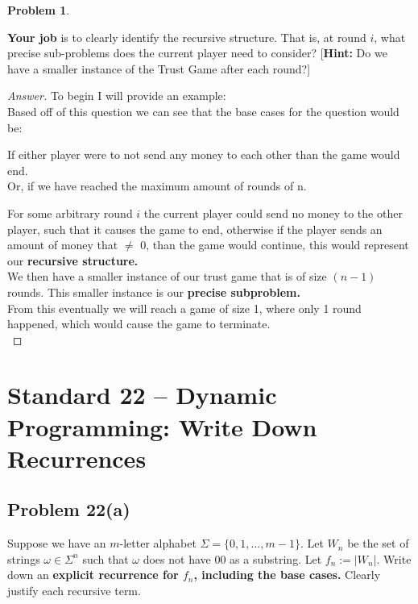 \documentclass[11pt]{article}
\theoremstyle{definition}
\theoremstyle{definition}
\newtheorem{required}{Problem}
\theoremstyle{definition}
\begin{document}
\begin{required}
\begin{enumerate}
\noindent \textbf{Your job} is to clearly identify the recursive structure. That is, at round $i$, what precise sub-problems does the current player need to consider? [\textbf{Hint:} Do we have a smaller instance of the Trust Game after each round?]

\begin{proof}[Answer]
To begin I will provide an example: \\

Based off of this question we can see that the base cases for the question would be: \\
\begin{center}
If either player were to not send any money to each other than the game would end. \\
Or, if we have reached the maximum amount of rounds of n.\\
\end{center}
For some arbitrary round $i$ the current player could send no money to the other player, such that it causes the game to end, otherwise if the player sends an amount of money that $\neq$ 0, than the game would continue, this would represent our \textbf{recursive structure.} \\

We then have a smaller instance of our trust game that is of size $(n-1)$ rounds. This smaller instance is our \textbf{precise subproblem.} \\

From this eventually we will reach a game of size 1, where only 1 round happened, which would cause the game to terminate. \\

\end{proof}
\end{enumerate}
\end{required}

\newpage
\section{Standard 22 -- Dynamic Programming: Write Down Recurrences}

\subsection*{Problem 22(a)}

Suppose we have an $m$-letter alphabet $\Sigma = \{0, 1, \ldots, m-1\}$. Let $W_{n}$ be the set of strings $\omega \in \Sigma^{n}$ such that $\omega$ does not have $00$ as a substring. Let $f_{n} := |W_{n}|$. Write down an \textbf{explicit recurrence for $f_{n}$, including the base cases.} Clearly justify each recursive term.
    
\end{document}

